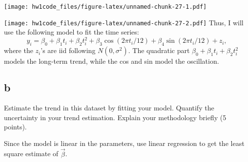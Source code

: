\documentclass[
]{article}
\newenvironment{Shaded}{\begin{snugshade}}{\end{snugshade}}
\newcommand{\AttributeTok}[1]{\textcolor[rgb]{0.77,0.63,0.00}{#1}}
\newcommand{\DecValTok}[1]{\textcolor[rgb]{0.00,0.00,0.81}{#1}}
\newcommand{\FunctionTok}[1]{\textcolor[rgb]{0.00,0.00,0.00}{#1}}
\newcommand{\NormalTok}[1]{#1}
\newcommand{\OtherTok}[1]{\textcolor[rgb]{0.56,0.35,0.01}{#1}}
\newcommand{\SpecialCharTok}[1]{\textcolor[rgb]{0.00,0.00,0.00}{#1}}
\begin{document}
\texttt{[image: hw1code\_files/figure-latex/unnamed-chunk-27-1.pdf]}

\begin{Shaded}
\end{Shaded}

\texttt{[image: hw1code\_files/figure-latex/unnamed-chunk-27-2.pdf]}
Thus, I will use the following model to fit the time series:
\[y_i = \beta_0 + \beta_1 t_i + \beta_2 t_i^2 + \beta_3 \cos(2\pi t_i/12) + \beta_4 \sin(2\pi t_i/12) + z_i,\]
where the \(z_i\)'s are iid following \(N(0, \sigma^2)\). The quadratic
part \(\beta_0 + \beta_1 t_i + \beta_2 t_i^2\) models the long-term
trend, while the cos and sin model the oscillation.

\hypertarget{b-1}{%
\subsection{b}\label{b-1}}

Estimate the trend in this dataset by fitting your model. Quantify the
uncertainty in your trend estimation. Explain your methodology briefly
(5 points).

Since the model is linear in the parameters, use linear regression to
get the least square estimate of \(\vec\beta\).

\begin{Shaded}
\end{Shaded}
\end{document}
